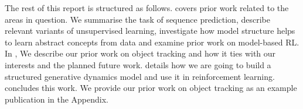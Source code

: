     The rest of this report is structured as follows.
     covers prior work related to the areas in question.
    We summarise the task of sequence prediction, describe relevant variants of unsupervised learning, investigate how model structure helps to learn abstract concepts from data and examine prior work on model-based RL.
    In , We describe our prior work on object tracking and how it ties with our interests and the planned future work.
     details how we are going to build a structured generative dynamics model and use it in reinforcement learning.
     concludes this work. We provide our prior work on object tracking as an example publication in the Appendix.




